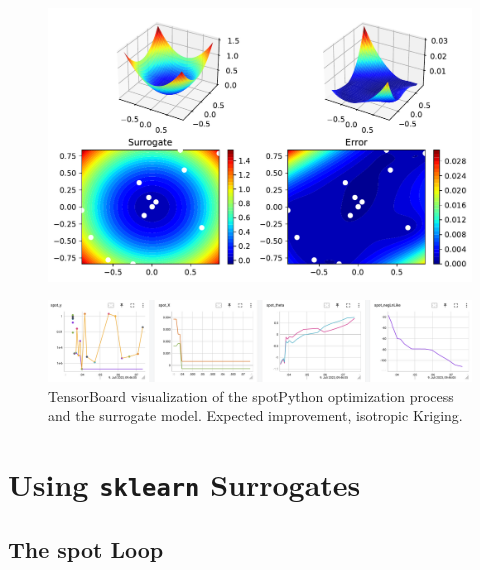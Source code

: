 \documentclass[
  letterpaper,
  DIV=11,
  numbers=noendperiod]{scrreprt}
\begin{document}
\begin{figure}[H]

{\centering \includegraphics{012_num_spot_ei_files/figure-pdf/cell-17-output-1.pdf}

}

\end{figure}

\begin{figure}

{\centering \includegraphics[width=1\textwidth,height=\textheight]{figures_static/07_tensorboard_EI_NONISO.png}

}

\caption{TensorBoard visualization of the spotPython optimization
process and the surrogate model. Expected improvement, isotropic
Kriging.}

\end{figure}

\hypertarget{using-sklearn-surrogates}{%
\section{\texorpdfstring{Using \texttt{sklearn}
Surrogates}{Using sklearn Surrogates}}\label{using-sklearn-surrogates}}

\hypertarget{the-spot-loop}{%
\subsection{The spot Loop}\label{the-spot-loop}}
\end{document}
